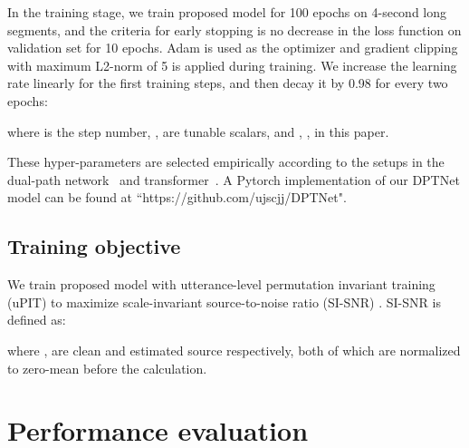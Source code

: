 \documentclass[a4paper]{article}
\begin{document}
In the training stage, we train proposed model for 100 epochs on 4-second long segments, and the criteria for early stopping is no decrease in the loss function on validation set for 10 epochs. Adam \cite{kingma2014adam} is used as the optimizer and gradient clipping with maximum L2-norm of 5 is applied during training. We increase the learning rate linearly for the first  training steps, and then decay it by 0.98 for every two epochs:

where  is the step number, ,  are tunable scalars, and , ,  in this paper.

These hyper-parameters are selected empirically according to the setups in the dual-path network~\cite{luo2019dual} and transformer~\cite{vaswani2017attention}. A Pytorch implementation of our DPTNet model can be found at ``https://github.com/ujscjj/DPTNet".

\subsection{Training objective}

We train proposed model with utterance-level permutation invariant training (uPIT) \cite{kolbaek2017multitalker} to maximize scale-invariant source-to-noise ratio (SI-SNR) \cite{luo2018tasnet}. SI-SNR is defined as:




where ,  are clean and estimated source respectively, both of which are normalized to zero-mean before the calculation.


\section{Performance evaluation}
\end{document}
